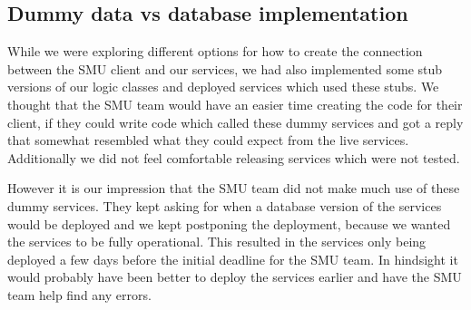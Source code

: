 \documentclass[../report.tex]{subfiles}
\begin{document}
\subsection{Dummy data vs database implementation}
While we were exploring different options for how to create the connection between the SMU client and our services, we had also implemented some stub versions of our logic classes and deployed services which used these stubs.
We thought that the SMU team would have an easier time creating the code for their client, if they could write code which called these dummy services and got a reply that somewhat resembled what they could expect from the live services.
Additionally we did not feel comfortable releasing services which were not tested.

However it is our impression that the SMU team did not make much use of these dummy services.
They kept asking for when a database version of the services would be deployed and we kept postponing the deployment, because we wanted the services to be fully operational.
This resulted in the services only being deployed a few days before the initial deadline for the SMU team.
In hindsight it would probably have been better to deploy the services earlier and have the SMU team help find any errors.
\end{document}
